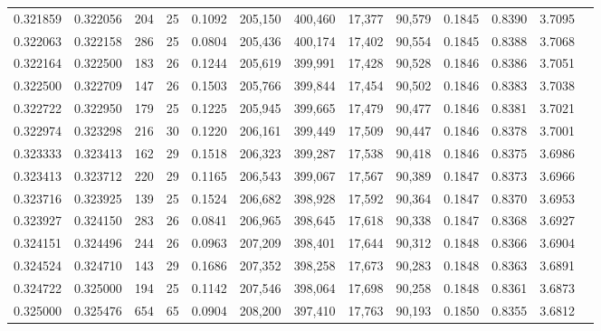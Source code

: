 \begin{tabular}{rrrrrrrrrrrrr}
0.321859 & 0.322056 &    204 &    25 &                                     0.1092 & 205,150 & 400,460 &  17,377 &  90,579 & 0.1845 & 0.8390 & 3.7095 \\
0.322063 & 0.322158 &    286 &    25 &                                     0.0804 & 205,436 & 400,174 &  17,402 &  90,554 & 0.1845 & 0.8388 & 3.7068 \\
0.322164 & 0.322500 &    183 &    26 &                                     0.1244 & 205,619 & 399,991 &  17,428 &  90,528 & 0.1846 & 0.8386 & 3.7051 \\
0.322500 & 0.322709 &    147 &    26 &                                     0.1503 & 205,766 & 399,844 &  17,454 &  90,502 & 0.1846 & 0.8383 & 3.7038 \\
0.322722 & 0.322950 &    179 &    25 &                                     0.1225 & 205,945 & 399,665 &  17,479 &  90,477 & 0.1846 & 0.8381 & 3.7021 \\
0.322974 & 0.323298 &    216 &    30 &                                     0.1220 & 206,161 & 399,449 &  17,509 &  90,447 & 0.1846 & 0.8378 & 3.7001 \\
0.323333 & 0.323413 &    162 &    29 &                                     0.1518 & 206,323 & 399,287 &  17,538 &  90,418 & 0.1846 & 0.8375 & 3.6986 \\
0.323413 & 0.323712 &    220 &    29 &                                     0.1165 & 206,543 & 399,067 &  17,567 &  90,389 & 0.1847 & 0.8373 & 3.6966 \\
0.323716 & 0.323925 &    139 &    25 &                                     0.1524 & 206,682 & 398,928 &  17,592 &  90,364 & 0.1847 & 0.8370 & 3.6953 \\
0.323927 & 0.324150 &    283 &    26 &                                     0.0841 & 206,965 & 398,645 &  17,618 &  90,338 & 0.1847 & 0.8368 & 3.6927 \\
0.324151 & 0.324496 &    244 &    26 &                                     0.0963 & 207,209 & 398,401 &  17,644 &  90,312 & 0.1848 & 0.8366 & 3.6904 \\
0.324524 & 0.324710 &    143 &    29 &                                     0.1686 & 207,352 & 398,258 &  17,673 &  90,283 & 0.1848 & 0.8363 & 3.6891 \\
0.324722 & 0.325000 &    194 &    25 &                                     0.1142 & 207,546 & 398,064 &  17,698 &  90,258 & 0.1848 & 0.8361 & 3.6873 \\
0.325000 & 0.325476 &    654 &    65 &                                     0.0904 & 208,200 & 397,410 &  17,763 &  90,193 & 0.1850 & 0.8355 & 3.6812 \\

\end{tabular}
